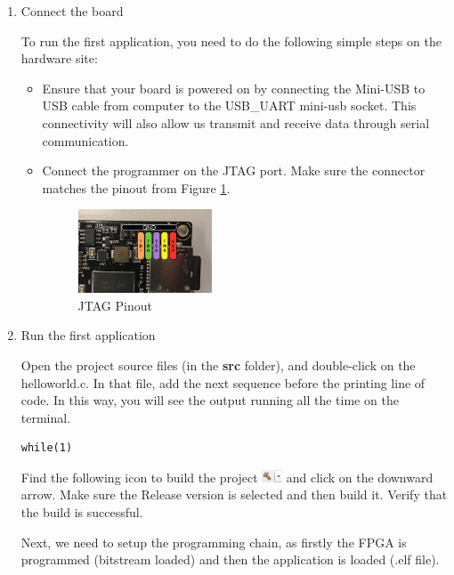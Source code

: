 \documentclass{article}
\newenvironment{myitemize}
{ \begin{itemize}
    \setlength{\itemsep}{0pt}
    \setlength{\parskip}{0pt}
    \setlength{\parsep}{0pt}     }
{ \end{itemize}                  }
\begin{document}
\begin{itemize}
\begin{enumerate}
\item Connect the board

To run the first application, you need to do the following simple steps on the hardware site:
\begin{myitemize}
\item Ensure that your board is powered on by connecting the Mini-USB to USB cable from computer to the USB\_UART mini-usb socket. This connectivity will also allow us transmit and receive data through serial communication.
\item Connect the programmer on the JTAG port. Make sure the connector matches the pinout from Figure \ref{fig:board_pinout}.

 
 \begin{figure}[h!]
    \centering
    \includegraphics[width=0.4\textwidth]{img/boardpinout.png}
    \caption{JTAG Pinout}
    \label{fig:board_pinout}
\end{figure}


\end{myitemize}

\item Run the first application

Open the project source files (in the \textbf{src} folder), and double-click on the helloworld.c. 
In that file, add the next sequence before the printing line of code. In this way, you will see the output running all the time on the terminal.

\begin{verbatim}
while(1)
\end{verbatim}

Find the following icon to build the project \includegraphics[width = 0.6cm]{img/run/build.png} and click on the downward arrow. Make sure the Release version is selected and then build it. Verify that the build is successful.



Next, we need to setup the programming chain, as firstly the FPGA is programmed (bitstream loaded) and then the application is loaded (.elf file).




\end{enumerate}
\end{itemize}
\end{document}
